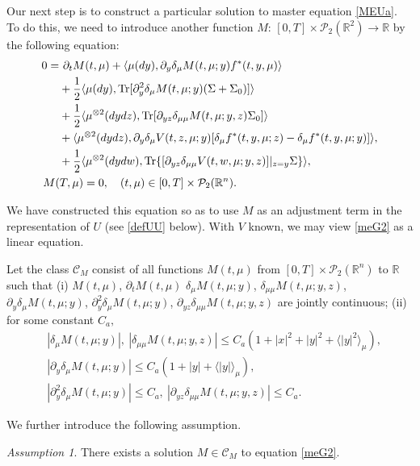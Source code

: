 \documentclass{amsart}
\theoremstyle{definition}
\theoremstyle{remark}
\newtheorem{assumption}[theorem]{Assumption}
\def\cal{\mathcal}
\numberwithin{equation}{section}
\begin{document}
Our next step is to construct a particular  solution to  master equation \eqref{MEUa}.  To do this, we need to introduce another function $M$: $[0,T]\times {\mathcal P}_2(\mathbb{R}^2)\to \mathbb{R}$ by
 the following equation:
\begin{align}
0=&\ \partial_t M(t, \mu)+
\langle  \mu(dy) ,  \partial_y \delta_\mu  M(t, \mu; y) f^*(t, y, \mu)     \rangle \label{meG2}\\
& +\frac12 \langle \mu(dy), \mbox{Tr} [\partial_{y}^2\delta_\mu M (t,\mu;y) (\Sigma+\Sigma_0)]\rangle \nonumber \\
& +\frac12 \langle \mu^{\otimes2}(dydz), \mbox{Tr}[ \partial_{yz}\delta_{\mu\mu} M (t,\mu;y,z) \Sigma_0]\rangle \nonumber \\
& + \langle \mu^{\otimes2}(dydz), \partial_{y}\delta_\mu V (t,z,\mu;y) [\delta_\mu f^*(t,y,\mu;z) -\delta_\mu f^*(t,y,\mu;y)   ]\rangle, \nonumber \\
&+ \frac12 \langle \mu^{\otimes2}(dydw), \mbox{Tr}\{  [\partial_{yz}\delta_{\mu\mu} V (t,w,\mu;y,z)]|_{z=y} \Sigma\}\rangle,  \nonumber\\
&\hskip -0.5cm  M(T,\mu)=0, \quad (t,\mu)\in[0,T]\times
 {\cal P}_2(\mathbb{R}^n).
\end{align}

We have constructed this equation so as to use $M$ as an adjustment term in the representation of $U$ (see \eqref{defUU} below).
 With $V$ known, we may view \eqref{meG2} as a linear equation.




Let  the class ${\cal C}_M$ consist of all functions $M(t, \mu)$ from $[0,T]\times {\cal P}_2(\mathbb{R}^n)$ to $\mathbb{R}$ such that (i) $M(t, \mu)$, $\partial_tM(t, \mu)$ $\delta_\mu M(t, \mu;y)$, $\delta_{\mu\mu} M(t, \mu; y,z)$, $\partial_y\delta_\mu M(t, \mu;y)$, $\partial_y^2\delta_\mu M(t, \mu;y)$, $\partial_{yz} \delta_{\mu\mu} M(t, \mu;y,z)$  are jointly continuous; (ii) for  some constant $C_a,$
\begin{align*}
 & |\delta_\mu M(t,\mu;y) |,\  |\delta_{\mu\mu} M(t,\mu;y,z) |\le C_a(1+|x|^2+|y|^2+ \langle |y|^2 \rangle_\mu ),   \\
&|\partial_y\delta_\mu M(t,\mu;y)|\le C_a(1+|y|+\langle |y|\rangle_{\mu}), \\
& |\partial_y^2\delta_\mu M(t,\mu;y)|\le C_a ,  \ |\partial_{yz}\delta_{\mu\mu} M(t,\mu;y,z)|\le C_a.
\end{align*}

 We further introduce the following assumption.
\begin{assumption}\label{assum:meM}
There exists a solution $M\in {\cal C}_M$ to equation \eqref{meG2}.
\end{assumption}
\end{document}
